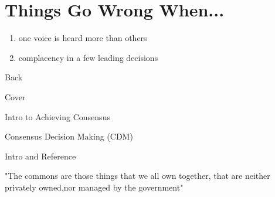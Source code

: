 \documentclass{article}
\begin{document}
		\section{Things Go Wrong When...}
	\begin{enumerate}
	\item one voice is heard more than others
	\item complacency in a few leading decisions
	\end{enumerate}
	\newpage
	Back\par Cover \thispagestyle{empty} \newpage
	
	Intro to Achieving       Consensus
	
	Consensus Decision Making (CDM) 
	
	Intro and Reference
	
	"The commons are those things     that we all own together, that are neither privately owned,nor managed by the government"
	
	 \thispagestyle{empty} \newpage
\end{document}
